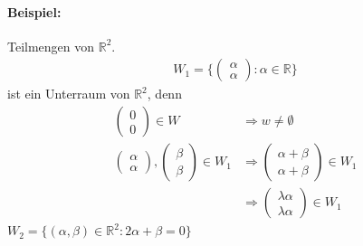 \documentclass[11pt]{report}
\newcommand*\Zb[1] {\mathbb{#1}}
\begin{document}
\paragraph{Beispiel:} Teilmengen von $\Zb{R}^{2}$.
\begin{align}
W_1 = \{ \begin{pmatrix}\alpha \\ \alpha\end{pmatrix}: \alpha \in \Zb{R}\} 
\end{align}
ist ein Unterraum von $\Zb{R}^2$, denn
\begin{align}
 \begin{pmatrix} 0 \\ 0 \end{pmatrix} \in W &\Rightarrow w \neq \emptyset \\
 \begin{pmatrix} \alpha \\ \alpha \end{pmatrix},  \begin{pmatrix} \beta \\ \beta \end{pmatrix} \in W_1 &\Rightarrow \begin{pmatrix} \alpha+\beta \\ \alpha+\beta \end{pmatrix} \in W_1 \\
&\Rightarrow  \begin{pmatrix} \lambda\alpha \\ \lambda\alpha \end{pmatrix} \in W_1
\end{align}
$W_2 = \{(\alpha, \beta) \in \Zb{R}^2: 2\alpha + \beta=0\}$
\end{document}
